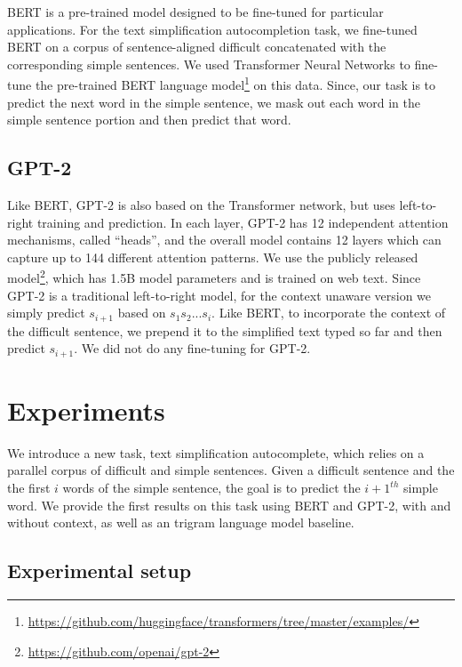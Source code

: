 \documentclass[11pt,a4paper]{article}
\newcommand{\comment}[1]{\textcolor{blue}{In Progress: #1}}
\begin{document}
BERT is a pre-trained model designed to be fine-tuned for particular applications. For the text simplification autocompletion task, we fine-tuned BERT on a corpus of sentence-aligned difficult concatenated with the corresponding simple sentences. We used Transformer Neural Networks to fine-tune the pre-trained BERT language model\footnote{\url{https://github.com/huggingface/transformers/tree/master/examples/}} on this data. Since, our task is to predict the next word in the simple sentence, we mask out each word in the simple sentence portion and then predict that word.


\subsection{GPT-2} 

Like BERT, GPT-2 is also based on the Transformer network, but uses left-to-right training and prediction. In each layer, GPT-2 has 12 independent attention mechanisms, called ``heads'', and the overall model contains 12 layers which can capture up to 144 different attention patterns.  We use the publicly released model\footnote{\url{https://github.com/openai/gpt-2}}, which has 1.5B model parameters and is trained on web text.  Since GPT-2 is a traditional left-to-right model, for the context unaware version we simply predict $s_{i+1}$ based on $s_1 s_2 ... s_i$.  Like BERT, to incorporate the context of the difficult sentence, we prepend it to the simplified text typed so far and then predict $s_{i+1}$.  We did not do any fine-tuning for GPT-2.

\section{Experiments} \label{sec:results}

We introduce a new task, text simplification autocomplete, which relies on a parallel corpus of difficult and simple sentences.  Given a difficult sentence and the the first $i$ words of the simple sentence, the goal is to predict the $i+1^{th}$ simple word.  We provide the first results on this task using BERT and GPT-2, with and without context, as well as an trigram language model baseline.

\subsection{Experimental setup}
\end{document}

